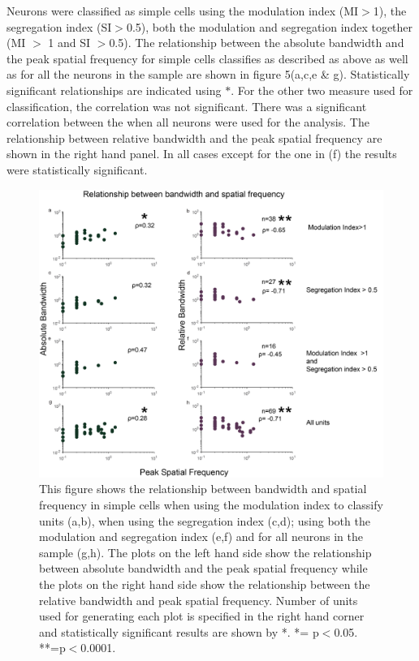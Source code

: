 	Neurons were classified as simple cells using the modulation index (MI$>$1), the segregation index (SI$>$0.5), both the modulation and segregation index together (MI $>$ 1 and SI $>$0.5). The relationship between the absolute bandwidth and the peak spatial frequency for simple cells classifies as described as above as well as for all the neurons in the sample are shown in figure 5(a,c,e \& g). Statistically significant relationships are indicated using $*$. For the other two measure used for classification, the correlation was not significant. There was a significant correlation between the when all neurons were used for the analysis. The relationship between relative bandwidth and the peak spatial frequency are shown in the right hand panel. In all cases except for the one in (f) the results were statistically significant.
	
		\begin{figure}[H]
		
		\includegraphics[width=\linewidth]{LinearV1/hwpksf.jpg}
		\caption{This figure shows the relationship between bandwidth and spatial frequency in simple cells when using the modulation index to classify units (a,b), when using the segregation index (c,d); using both the modulation and segregation index (e,f) and for all neurons in the sample (g,h). The plots on the left hand side show the relationship between absolute bandwidth and the peak spatial frequency while the plots on the right hand side show the relationship between the relative bandwidth and peak spatial frequency. Number of units used for generating each plot is specified in the right hand corner and statistically significant results are shown by *. *= p$<$0.05. **=p$<$0.0001.}
		\label{fig:fig6}
	\end{figure}
	

